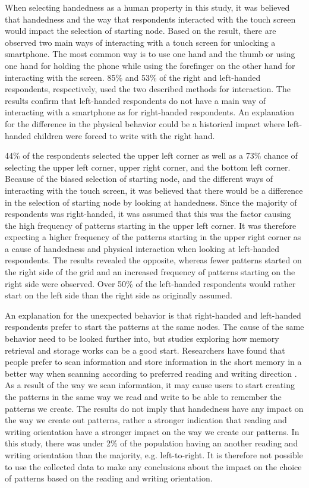     When selecting handedness as a human property in this study, it was believed that handedness and the way that respondents interacted with the touch screen would impact the selection of starting node. Based on the result, there are observed two main ways of interacting with a touch screen for unlocking a smartphone. The most common way is to use one hand and the thumb or using one hand for holding the phone while using the forefinger on the other hand for interacting with the screen. 85\% and 53\% of the right and left-handed respondents, respectively, used the two described methods for interaction. The results confirm that left-handed respondents do not have a main way of interacting with a smartphone as for right-handed respondents. An explanation for the difference in the physical behavior could be a historical impact where left-handed children were forced to write with the right hand.

    44\% of the respondents selected the upper left corner as well as a 73\% chance of selecting the upper left corner, upper right corner, and the bottom left corner. Because of the biased selection of starting node, and the different ways of interacting with the touch screen, it was believed that there would be a difference in the selection of starting node by looking at handedness. Since the majority of respondents was right-handed, it was assumed that this was the factor causing the high frequency of patterns starting in the upper left corner. It was therefore expecting a higher frequency of the patterns starting in the upper right corner as a cause of handedness and physical interaction when looking at left-handed respondents. The results revealed the opposite, whereas fewer patterns started on the right side of the grid and an increased frequency of patterns starting on the right side were observed. Over 50\% of the left-handed respondents would rather start on the left side than the right side as originally assumed.  

    An explanation for the unexpected behavior is that right-handed and left-handed respondents prefer to start the patterns at the same nodes. The cause of the same behavior need to be looked further into, but studies exploring how memory retrieval and storage works can be a good start. Researchers have found that people prefer to scan information and store information in the short memory in a better way when scanning according to preferred reading and writing direction \cite{Chan}. As a result of the way we scan information, it may cause users to start creating the patterns in the same way we read and write to be able to remember the patterns we create. The results do not imply that handedness have any impact on the way we create out patterns, rather a stronger indication that reading and writing orientation have a stronger impact on the way we create our patterns. In this study, there was under 2\% of the population having an another reading and writing orientation than the majority, e.g. left-to-right. It is therefore not possible to use the collected data to make any conclusions about the impact on the choice of patterns based on the reading and writing orientation.

